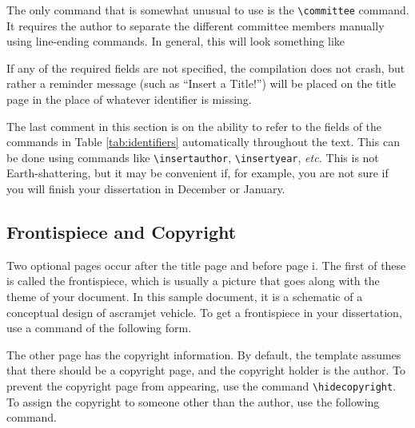 The only command that is somewhat unusual to use is the
\verb|\committee| command.  It requires the author to separate the
different committee members manually using line-ending commands.  In
general, this will look something like
\begin{code}
\end{code}
If any of the required fields are not specified, the compilation does
not crash, but rather a reminder message (such as ``Insert a Title!'')
will be placed on the title page in the place of whatever identifier
is missing.

The last comment in this section is on the ability to refer to the
fields of the commands in Table \ref{tab:identifiers} automatically
throughout the text.  This can be done using commands like
\verb|\insertauthor|, \verb|\insertyear|, \textit{etc.}  This is not
Earth-shattering, but it may be convenient if, for example, you are
not sure if you will finish your dissertation in December or January.

\subsection{Frontispiece and Copyright}
Two optional pages occur after the title page and before page i.  The
first of these is called the frontispiece, which is usually a picture
that goes along with the theme of your document.  In this sample
document, it is a schematic of a conceptual design of ascramjet vehicle.
To get a frontispiece in your dissertation, use a command of the
following form.
\begin{code}
\frontispiece{\texttt{[image: ...]}}
\end{code}

The other page has the copyright information.  By default, the template
assumes that there should be a copyright page, and the copyright
holder is the author.  To prevent the copyright page from appearing,
use the command \verb|\hidecopyright|.  To assign the copyright to
someone other than the author, use the following command.
\begin{code}
\end{code}


